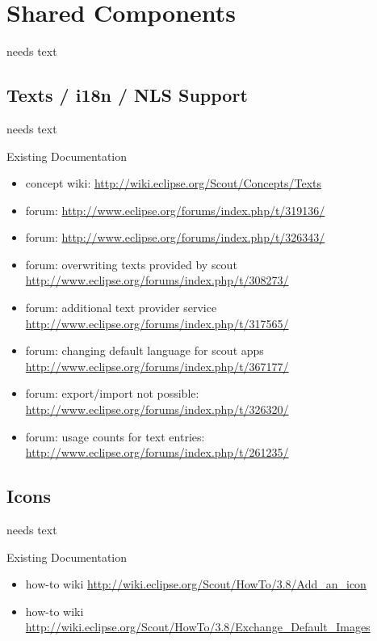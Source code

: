 \documentclass[a4paper,10pt,twoside]{book}
\begin{document}
\chapter{Shared Components}
needs text
  
\section{Texts / i18n / NLS Support}
needs text

\noindent Existing Documentation
\begin{itemize}
  \item concept wiki: \url{http://wiki.eclipse.org/Scout/Concepts/Texts}
  \item forum: \url{http://www.eclipse.org/forums/index.php/t/319136/}
  \item forum: \url{http://www.eclipse.org/forums/index.php/t/326343/}
  \item forum: overwriting texts provided by scout \url{http://www.eclipse.org/forums/index.php/t/308273/}
  \item forum: additional text provider service \url{http://www.eclipse.org/forums/index.php/t/317565/}
  \item forum: changing default language for scout apps \url{http://www.eclipse.org/forums/index.php/t/367177/}
  \item forum: export/import not possible: \url{http://www.eclipse.org/forums/index.php/t/326320/}
  \item forum: usage counts for text entries: \url{http://www.eclipse.org/forums/index.php/t/261235/}
\end{itemize}

\section{Icons}
needs text

\noindent Existing Documentation
\begin{itemize}
  \item how-to wiki \url{http://wiki.eclipse.org/Scout/HowTo/3.8/Add_an_icon}
  \item how-to wiki \url{http://wiki.eclipse.org/Scout/HowTo/3.8/Exchange_Default_Images}
\end{itemize}
\end{document}
